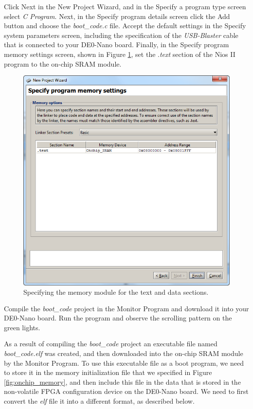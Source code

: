 \documentclass[11pt, twoside, pdftex]{article}
\begin{document}
Click {\sf Next} in the New Project Wizard, and in the {\sf Specify a program type} screen 
select {\it C Program}.  Next, in the {\sf Specify program details} screen click 
the {\sf Add} button and choose the {\it boot\_code.c} file. Accept the default 
settings in the {\sf Specify system parameters} screen, including the specification of the
{\it USB-Blaster} cable that is connected to your DE0-Nano board. Finally, in the 
{\sf Specify program memory settings} screen, shown in Figure \ref{fig:text_data}, 
set the .{\it text} section of the Nios II program to the on-chip SRAM module. 

\begin{figure}[H]
   \begin{center}
        \includegraphics[scale=.8]{figures/text_data.png}
   \end{center}
   \caption{Specifying the memory module for the text and data sections.}
	\label{fig:text_data}
\end{figure}

Compile the {\it boot\_code} project in the Monitor Program and download it into your
DE0-Nano board. Run the program and observe the scrolling pattern on the green lights.

As a result of compiling the {\it boot\_code} project an executable file named
{\it boot\_code.elf} was created, and then downloaded into the on-chip SRAM module by the 
Monitor Program. To use this executable file as a boot program, we need to store it in the
memory initialization file that we specified in Figure \ref{fig:onchip_memory}, and then
include this file in the data that is stored in the non-volatile FPGA configuration device
on the DE0-Nano board. We need to first convert the {\it elf} file it into a different 
format, as described below. 
\end{document}
